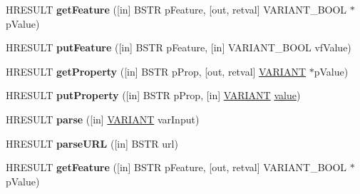 \begin{DoxyCompactItemize}
\item 
\mbox{\label{interface_m_s_x_m_l2_1_1_i_v_b_s_a_x_x_m_l_reader_acb2c4a72c314e648d66f7382dcb8d452}} 
H\+R\+E\+S\+U\+LT {\bfseries get\+Feature} (\mbox{[}in\mbox{]} B\+S\+TR p\+Feature, \mbox{[}out, retval\mbox{]} V\+A\+R\+I\+A\+N\+T\+\_\+\+B\+O\+OL $\ast$p\+Value)
\item 
\mbox{\label{interface_m_s_x_m_l2_1_1_i_v_b_s_a_x_x_m_l_reader_abec321258f6a964c409c03ee69144b86}} 
H\+R\+E\+S\+U\+LT {\bfseries put\+Feature} (\mbox{[}in\mbox{]} B\+S\+TR p\+Feature, \mbox{[}in\mbox{]} V\+A\+R\+I\+A\+N\+T\+\_\+\+B\+O\+OL vf\+Value)
\item 
\mbox{\label{interface_m_s_x_m_l2_1_1_i_v_b_s_a_x_x_m_l_reader_aa3fc960b6d308516e2e0d693fe264a35}} 
H\+R\+E\+S\+U\+LT {\bfseries get\+Property} (\mbox{[}in\mbox{]} B\+S\+TR p\+Prop, \mbox{[}out, retval\mbox{]} \hyperlink{structtag_v_a_r_i_a_n_t}{V\+A\+R\+I\+A\+NT} $\ast$p\+Value)
\item 
\mbox{\label{interface_m_s_x_m_l2_1_1_i_v_b_s_a_x_x_m_l_reader_a71fb6b5aa7f1f8b918011f606c98312e}} 
H\+R\+E\+S\+U\+LT {\bfseries put\+Property} (\mbox{[}in\mbox{]} B\+S\+TR p\+Prop, \mbox{[}in\mbox{]} \hyperlink{structtag_v_a_r_i_a_n_t}{V\+A\+R\+I\+A\+NT} \hyperlink{unionvalue}{value})
\item 
\mbox{\label{interface_m_s_x_m_l2_1_1_i_v_b_s_a_x_x_m_l_reader_a34ea86ba6ed75fb16b5783054c5309fe}} 
H\+R\+E\+S\+U\+LT {\bfseries parse} (\mbox{[}in\mbox{]} \hyperlink{structtag_v_a_r_i_a_n_t}{V\+A\+R\+I\+A\+NT} var\+Input)
\item 
\mbox{\label{interface_m_s_x_m_l2_1_1_i_v_b_s_a_x_x_m_l_reader_a24d452e71f3fd71b33f8618506af9989}} 
H\+R\+E\+S\+U\+LT {\bfseries parse\+U\+RL} (\mbox{[}in\mbox{]} B\+S\+TR url)
\item 
\mbox{\label{interface_m_s_x_m_l2_1_1_i_v_b_s_a_x_x_m_l_reader_acb2c4a72c314e648d66f7382dcb8d452}} 
H\+R\+E\+S\+U\+LT {\bfseries get\+Feature} (\mbox{[}in\mbox{]} B\+S\+TR p\+Feature, \mbox{[}out, retval\mbox{]} V\+A\+R\+I\+A\+N\+T\+\_\+\+B\+O\+OL $\ast$p\+Value)

\end{DoxyCompactItemize}
